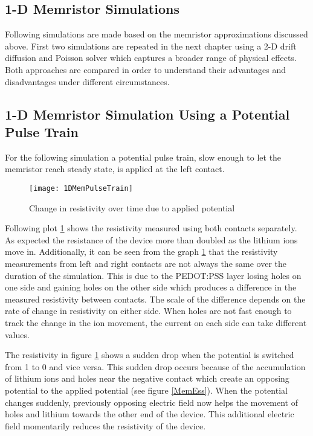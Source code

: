 \begin{doublespace}
\clearpage
\section{1-D Memristor Simulations}

Following simulations are made based on the memristor approximations discussed above. First two simulations are repeated in the next chapter using a 2-D drift diffusion and Poisson solver which captures a broader range of physical effects. Both approaches are compared in order to understand their advantages and disadvantages under different circumstances.

\subsection{1-D Memristor Simulation Using a Potential Pulse Train}
  
For the following simulation a potential pulse train, slow enough to let the memristor reach steady state, is applied at the left contact.
\begin{figure}[!htp]
\centering
\texttt{[image: 1DMemPulseTrain]}
\caption{Change in resistivity over time due to applied potential} 
\label{MemResTrain}
\end{figure}
 Following plot \ref{MemResTrain} shows the resistivity measured using both contacts separately. As expected the resistance of the device more than doubled as the lithium ions move in. Additionally, it can be seen from the graph \ref{MemResTrain} that the resistivity measurements from left and right contacts are not always the same over the duration of the simulation. This is due to the PEDOT:PSS layer losing holes on one side and gaining holes on the other side which produces a difference in the measured resistivity between contacts. The scale of the difference depends on the rate of change in resistivity on either side. When holes are not fast enough to track the change in the ion movement, the current on each side can take different values.  

The resistivity in figure \ref{MemResTrain} shows a sudden drop when the potential is switched from 1 to 0 and vice versa. This sudden drop occurs because of the accumulation of lithium ions and holes near the negative contact which create an opposing potential to the applied potential (see figure \ref{MemEss}). When the potential changes suddenly, previously opposing electric field now helps the movement of holes and lithium towards the other end of the device. This additional electric field momentarily reduces the resistivity of the device.


\end{doublespace}
